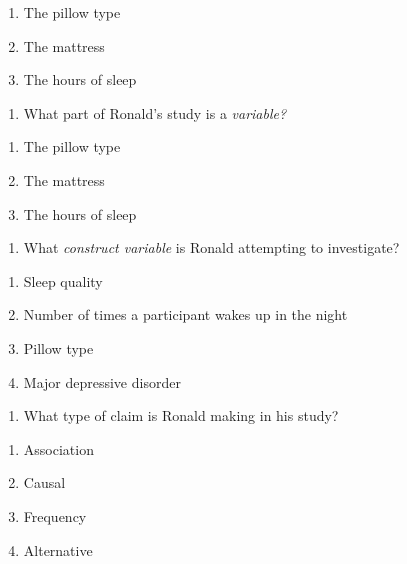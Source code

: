 \documentclass[
  12pt,
  letterpaper,
  DIV=11,
  numbers=noendperiod]{scrartcl}
\providecommand{\tightlist}{%
  \setlength{\itemsep}{0pt}\setlength{\parskip}{0pt}}\usepackage{longtable,booktabs,array}
\begin{document}
\begin{enumerate}
\def\labelenumi{\alph{enumi}.}
\tightlist
\item
  The pillow type
\item
  The mattress
\item
  The hours of sleep
\end{enumerate}

\begin{enumerate}
\def\labelenumi{\arabic{enumi}.}
\setcounter{enumi}{11}
\tightlist
\item
  What part of Ronald's study is a \emph{variable?}
\end{enumerate}

\begin{enumerate}
\def\labelenumi{\alph{enumi}.}
\tightlist
\item
  The pillow type
\item
  The mattress
\item
  The hours of sleep
\end{enumerate}

\begin{enumerate}
\def\labelenumi{\arabic{enumi}.}
\setcounter{enumi}{12}
\tightlist
\item
  What \emph{construct variable} is Ronald attempting to investigate?
\end{enumerate}

\begin{enumerate}
\def\labelenumi{\alph{enumi}.}
\tightlist
\item
  Sleep quality
\item
  Number of times a participant wakes up in the night
\item
  Pillow type
\item
  Major depressive disorder
\end{enumerate}

\begin{enumerate}
\def\labelenumi{\arabic{enumi}.}
\setcounter{enumi}{13}
\tightlist
\item
  What type of claim is Ronald making in his study?
\end{enumerate}

\begin{enumerate}
\def\labelenumi{\alph{enumi}.}
\tightlist
\item
  Association
\item
  Causal
\item
  Frequency
\item
  Alternative
\end{enumerate}
\end{document}
